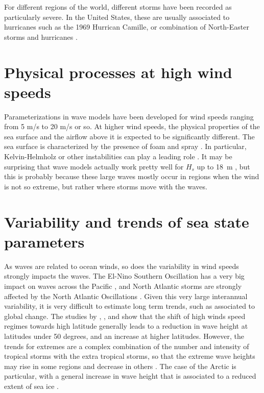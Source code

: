 For different regions of the world, different storms have been recorded as particularly severe. In the United States, these are usually associated to hurricanes 
such as the 1969 Hurrican Camille, or combination of North-Easter storms and hurricanes \cite[e.g. the 1991 Perfect Storm that inspired the movie, see][]{Bromirski2001}. 

\section{Physical processes at high wind speeds}
Parameterizations in wave models have been developed for wind speeds ranging from 5 m/s \citep{Snyder&al.1981} to 20 m/s or so. At higher wind speeds, 
the physical properties of the sea surface and the airflow above it is expected to be significantly different. The sea surface is 
characterized by the presence of foam and spray \citep[e.g.][]{Holthuijsen&al.2012}. In particular, Kelvin-Helmholz or other 
instabilities can play a leading role \cite{Soloviev&al.2014}. It may be surprising that wave models actually work pretty well for $H_s$ up to 18~m \citep{Rascle&Ardhuin2013},
but this is probably because these large waves mostly occur in regions when the wind is not so extreme, but rather where storms move with the waves. 

\section{Variability and trends of sea state parameters}
As waves are related to ocean winds, so does the variability in wind speeds strongly impacts the waves. The El-Nino Southern Oscillation has a very big 
impact on waves across the Pacific \citep{Bromirski&al.2005,Stopa&Cheung2014}, and North Atlantic storms are strongly affected by the North Atlantic 
Oscillations \citep[e.g.][]{Dodet&al.2010,Charles&al.2012}. Given this very large interannual variability, it is very difficult to estimate 
long term trends, such as associated to global change. The studies by \cite{Hemer&al.2013}, \cite{Wang&al.2014}, and \cite{Shimural&al.2016b} show that 
the shift of high winds speed regimes towards high latitude generally leads to a reduction in wave height at latitudes under 50 degrees, and an increase 
at higher latitudes. However, the trends for extremes are a complex combination of the number and intensity of tropical storms with the extra tropical 
storms, so that the extreme wave heights may rise in some regions and decrease in others \citep{Shimural&al.2016b}. The case of the Arctic is particular, 
with a general increase in wave height that is associated to a reduced extent of sea ice \citep{Stopa&al.2016b}.

